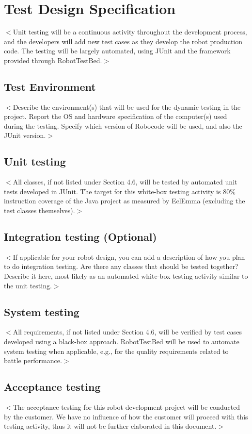 \documentclass{scrreprt}
\begin{document}
\chapter{Test Design Specification}
$<$Unit testing will be a continuous activity throughout the development process, and the developers will add new test cases as they develop the robot production code. The testing will be largely automated, using JUnit and the framework provided through RobotTestBed.$>$

\section{Test Environment}
$<$Describe the environment(s) that will be used for the dynamic testing in the project. Report the OS and hardware specification of the computer(s) used during the testing. Specify which version of Robocode will be used, and also the JUnit version.$>$

\section{Unit testing}
$<$All classes, if not listed under Section 4.6, will be tested by automated unit tests developed in JUnit. The target for this white-box testing activity is 80\% instruction coverage of the Java project as measured by EclEmma (excluding the test classes themselves).$>$

\section{Integration testing (Optional)}
$<$If applicable for your robot design, you can add a description of how you plan to do integration testing. Are there any classes that should be tested together? Describe it here, most likely as an automated white-box testing activity similar to the unit testing.$>$

\section{System testing}
$<$All requirements, if not listed under Section 4.6, will be verified by test cases developed using a black-box approach. RobotTestBed will be used to automate system testing when applicable, e.g., for the quality requirements related to battle performance.$>$

\section{Acceptance testing}
$<$The acceptance testing for this robot development project will be conducted by the customer. We have no influence of how the customer will proceed with this testing activity, thus it will not be further elaborated in this document.$>$
\end{document}
